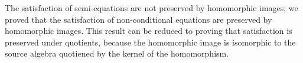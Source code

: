 The satisfaction of semi-equations are not preserved by homomorphic
images; we proved that the satisfaction of non-conditional equations
are preserved by homomorphic images. This result can be reduced to
proving that satisfaction is preserved under quotients, because the
homomorphic image is isomorphic to the source algebra quotiened by
the kernel of the homomorphism.
\begin{code}
\>[3]\AgdaSpace{}%
\AgdaSpace{}%
\AgdaSpace{}%
\AgdaSymbol{=}\AgdaSpace{}%
\<%
\\
\>[3][@{}l@{\AgdaIndent{0}}]%
\>[5]\AgdaSpace{}%
\AgdaSpace{}%
%
\>[25]\AgdaSpace{}%
\AgdaSpace{}%
\AgdaSpace{}%
\<%
\\
%
\>[5]\AgdaSpace{}%
\AgdaSpace{}%
\AgdaSpace{}%
\AgdaSpace{}%
\AgdaSpace{}%
\AgdaSpace{}%
\AgdaSpace{}%
%
\>[26]\AgdaSpace{}%
\AgdaSpace{}%
\AgdaSymbol{(}\AgdaSpace{}%
\AgdaSpace{}%
\AgdaSpace{}%
\AgdaSymbol{)}\AgdaSpace{}%
\AgdaSymbol{(}\AgdaSpace{}%
\AgdaSpace{}%
\AgdaSymbol{)}\AgdaSpace{}%
\<%
\\
%
\>[5]\AgdaSpace{}%
\AgdaSpace{}%
\AgdaSpace{}%
\AgdaSpace{}%
\AgdaSpace{}%
\AgdaSpace{}%
\AgdaSpace{}%
%
\>[26]\AgdaSpace{}%
\AgdaSpace{}%
\AgdaSymbol{(}\AgdaSpace{}%
\AgdaSymbol{)}\AgdaSpace{}%
\<%
\\
%
\>[5]\AgdaSpace{}%
\AgdaSpace{}%
\AgdaSpace{}%
\<%
\\
%
\>[5]\<%
\\
%
\>[5]\AgdaSpace{}%

\end{code}
